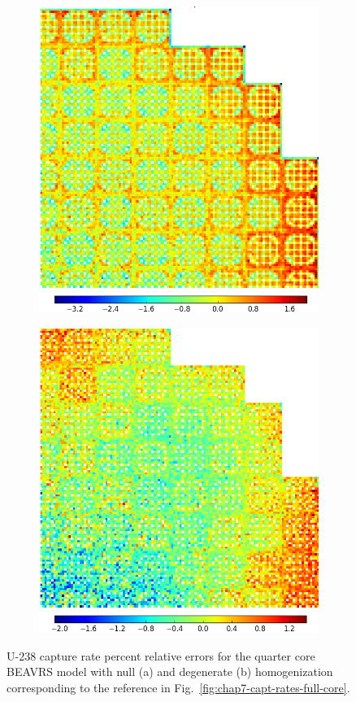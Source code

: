\begin{figure}[h!]
\centering
\begin{subfigure}{\textwidth}
  \centering
  \includegraphics[width=0.6\linewidth]{figures/quantification/full-core/capt-err-null}
  \caption{}
  \label{fig:chap8-full-core-capt-err-null}
\end{subfigure}
\vspace{4mm}
\begin{subfigure}{\textwidth}
  \centering
  \includegraphics[width=0.6\linewidth]{figures/quantification/full-core/capt-err-degenerate}
  \caption{}
  \label{fig:chap8-full-core-capt-err-degenerate}
\end{subfigure}
\caption[U-238 capture rate errors for the quarter core \ac{BEAVRS} model]{U-238 capture rate percent relative errors for the quarter core \ac{BEAVRS} model with null (a) and degenerate (b) homogenization corresponding to the reference in Fig.~\ref{fig:chap7-capt-rates-full-core}.}
\label{fig:chap8-full-core-capt-err}
\end{figure}

